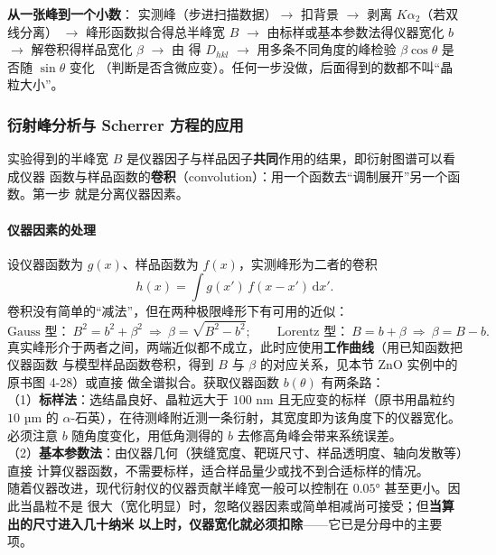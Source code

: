 \begin{dataflow}
\textbf{从一张峰到一个小数}：
实测峰（步进扫描数据）$\rightarrow$ 扣背景 $\rightarrow$ 剥离 $K\alpha_{2}$（若双线分离）
$\rightarrow$ 峰形函数拟合得总半峰宽 $B$ $\rightarrow$ 由标样或基本参数法得仪器宽化 $b$
$\rightarrow$ 解卷积得样品宽化 $\beta$ $\rightarrow$ 由 得
$D_{hkl}$ $\rightarrow$ 用多条不同角度的峰检验 $\beta\cos\theta$ 是否随 $\sin\theta$ 变化
（判断是否含微应变）。任何一步没做，后面得到的数都不叫``晶粒大小''。
\end{dataflow}

\subsubsection{衍射峰分析与 Scherrer 方程的应用}

实验得到的半峰宽 $B$ 是仪器因子与样品因子\textbf{共同}作用的结果，即衍射图谱可以看成仪器
函数与样品函数的\textbf{卷积}（convolution）：用一个函数去``调制展开''另一个函数。第一步
就是分离仪器因素。

\paragraph{仪器因素的处理}
\begin{principle}
设仪器函数为 $g(x)$、样品函数为 $f(x)$，实测峰形为二者的卷积
\begin{equation}
h(x)=\int g(x')\,f(x-x')\,\mathrm{d}x' .
\label{eq:ch04c-conv}
\end{equation}
卷积没有简单的``减法''，但在两种极限峰形下有可用的近似：
\begin{equation}
\text{Gauss 型：}\ B^{2}=b^{2}+\beta^{2}\ \Rightarrow\ \beta=\sqrt{B^{2}-b^{2}};
\qquad
\text{Lorentz 型：}\ B=b+\beta\ \Rightarrow\ \beta=B-b .
\label{eq:ch04c-subtract}
\end{equation}
真实峰形介于两者之间，两端近似都不成立，此时应使用\textbf{工作曲线}（用已知函数把仪器函数
与模型样品函数卷积，得到 $B$ 与 $\beta$ 的对应关系，见本节 ZnO 实例中的原书图 4-28）或直接
做全谱拟合。获取仪器函数 $b(\theta)$ 有两条路：\\
（1）\textbf{标样法}：选结晶良好、晶粒远大于 $100$ nm 且无应变的标样（原书用晶粒约
$10$ µm 的 $\alpha$-石英），在待测峰附近测一条衍射，其宽度即为该角度下的仪器宽化。
必须注意 $b$ 随角度变化，用低角测得的 $b$ 去修高角峰会带来系统误差。\\
（2）\textbf{基本参数法}：由仪器几何（狭缝宽度、靶斑尺寸、样品透明度、轴向发散等）直接
计算仪器函数，不需要标样，适合样品量少或找不到合适标样的情况。\\
随着仪器改进，现代衍射仪的仪器贡献半峰宽一般可以控制在 $0.05°$ 甚至更小。因此当晶粒不是
很大（宽化明显）时，忽略仪器因素或简单相减尚可接受；但\textbf{当算出的尺寸进入几十纳米
以上时，仪器宽化就必须扣除}——它已是分母中的主要项。
\end{principle}

